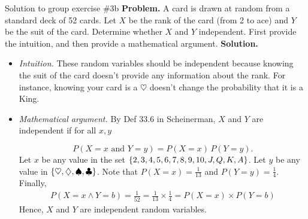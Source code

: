 \documentclass[10pt]{beamer}
\begin{document}
\begin{frame}{Solution to group exercise \#3b}
\small
\textbf{Problem.} A card is drawn at random from a standard deck of 52 cards. Let $X$ be the rank of the card (from 2 to ace) and $Y$ be the suit of the card. Determine whether $X$ and $Y$ independent. First provide the intuition, and then provide a mathematical argument.  
\vfill 
\vspace{-.2cm}
\textbf{Solution.}
\vspace{-.2cm}
\begin{itemize}
\item \textit{Intuition.} These random variables should be independent because knowing the suit of the card doesn't provide any information about the rank.  For instance, knowing your card is a $\heartsuit$ doesn't change the probability that it is a King.
\vfill 
\item \textit{Mathematical argument.} By Def 33.6 in Scheinerman, $X$ and $Y$ are independent if for all $x,y$

\[P(X=x \text{ and } Y=y) = P(X=x) \, P(Y=y). \]
Let $x$ be any value in the set $\{ {2,3,4,5,6,7,8,9,10,J,Q,K,A} \}$.  Let $y$ be any value in $\{ {\heartsuit, \diamondsuit, \spadesuit, \clubsuit} \}$. Note that $P(X=x) = \frac{1}{13}$ and $P(Y=y) = \frac{1}{4}$.  Finally,
%
\begin{align*}
P(X=x \land Y=b) = \frac{1}{52} = 	\frac{1}{13} \times \frac{1}{4} = P(X=x) \times P(Y=b)
\end{align*}
%
Hence, $X$ and $Y$ are independent random variables.


\end{itemize}

\end{frame}
\end{document}
